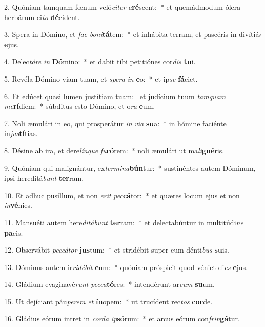 2. Quóniam tamquam fœnum veló\textit{ci}\textit{ter} \textit{a}\textbf{ré}scent:~*  et quemádmodum ólera herbárum ci\textit{to} \textbf{dé}cident.\

3. Spera in Dómino, et \textit{fac} \textit{bo}\textit{ni}\textbf{tá}tem:~*  et inhábita terram, et pascéris in divíti\textit{is} \textbf{e}jus.\

4. Delec\textit{tá}\textit{re} \textit{in} \textbf{Dó}mino:~*  et dabit tibi petitiónes cor\textit{dis} \textbf{tu}i.\

5. Revéla Dómino viam tuam, et \textit{spe}\textit{ra} \textit{in} \textbf{e}o:~*  et ip\textit{se} \textbf{fá}ciet.\

6. Et edúcet quasi lumen justítiam tuam: \dag\  et judícium tuum \textit{tam}\textit{quam} \textit{me}\textbf{rí}diem:~*  súbditus esto Dómino, et o\textit{ra} \textbf{e}um.\

7. Noli æmulári in eo, qui prosperátur \textit{in} \textit{vi}\textit{a} \textbf{su}a:~*  in hómine faciénte in\textit{jus}\textbf{tí}tias.\

8. Désine ab ira, et dere\textit{lín}\textit{que} \textit{fu}\textbf{ró}rem:~*  noli æmulári ut ma\textit{li}\textbf{gné}ris.\

9. Quóniam qui malignántur, ex\textit{ter}\textit{mi}\textit{na}\textbf{bún}tur:~*  sustinéntes autem Dóminum, ipsi hereditá\textit{bunt} \textbf{ter}ram.\

10. Et adhuc pusíllum, et non \textit{e}\textit{rit} \textit{pec}\textbf{cá}tor:~*  et quæres locum ejus et non \textit{in}\textbf{vé}nies.\

11. Mansuéti autem here\textit{di}\textit{tá}\textit{bunt} \textbf{ter}ram:~*  et delectabúntur in multitúdi\textit{ne} \textbf{pa}cis.\

12. Observábit \textit{pec}\textit{cá}\textit{tor} \textbf{jus}tum:~*  et stridébit super eum dénti\textit{bus} \textbf{su}is.\

13. Dóminus autem ir\textit{ri}\textit{dé}\textit{bit} \textbf{e}um:~*  quóniam próspicit quod véniet di\textit{es} \textbf{e}jus.\

14. Gládium evaginavé\textit{runt} \textit{pec}\textit{ca}\textbf{tó}res:~*  intendérunt ar\textit{cum} \textbf{su}um,\

15. Ut dejíciant páu\textit{pe}\textit{rem} \textit{et} \textbf{ín}opem:~*  ut trucídent rec\textit{tos} \textbf{cor}de.\

16. Gládius eórum intret in \textit{cor}\textit{da} \textit{ip}\textbf{só}rum:~*  et arcus eórum con\textit{frin}\textbf{gá}tur.\

